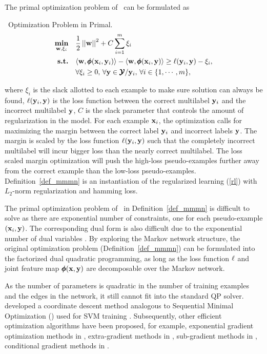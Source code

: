 {The primal optimization problem of \mmmn\ can be formulated as
\begin{definition}{\mmmn\ Optimization Problem in Primal.}\label{def_mmmn}
	\begin{align*}
		\underset{\mathbf {w},\mathbf{\xi}_i}{\textbf{min}} & \quad\frac{1}{2}\left|\left| \mathbf {w} \right|\right|^2 + C\sum_{i=1}^{m}\xi_i \\
		\textbf{s.t.} & \quad\langle \mathbf {w}, \pmb \phi(\mathbf {x}_i,\mathbf {y}_i) \rangle - \langle \mathbf {w}, \pmb \phi(\mathbf {x}_i,\mathbf {y}) \rangle \ge \mathbf {\ell}(\mathbf {y}_i,\mathbf {y})-\xi_i,\\
		& \quad \forall \xi_i\ge0,\, \forall \mathbf {y}\in\pmb {\mathcal{Y}}/\mathbf {y}_i,\, \forall i\in\{1,\cdots,m\},
	\end{align*}
\end{definition}
\noindent
where $\xi_i$ is the slack allotted to each example to make sure solution can always be found, $\mathbf {\ell}(\mathbf {y}_i,\mathbf {y})$ is the loss function between the correct multilabel $\mathbf {y}_i$ and the incorrect multilabel $\mathbf {y}$, $C$ is the slack parameter that controls the amount of regularization in the model.
For each example $\mathbf {x}_i$, the optimization calls for maximizing the margin between the correct label $\mathbf {y}_i$ and incorrect labels $\mathbf {y}$.
The margin is scaled by the loss function $\mathbf {\ell}(\mathbf {y}_i,{\mathbf {y}})$ such that the completely incorrect multilabel will incur bigger loss than the nearly correct multilabel.
The loss scaled margin optimization will push the high-loss pseudo-examples further away from the correct example than the low-loss pseudo-examples.
Definition~\ref{def_mmmn} is an instantiation of the regularized learning (\ref{rl}) with $L_2$-norm regularization and hamming loss.


The primal optimization problem of \mmmn\ in Definition~\ref{def_mmmn} is difficult to solve as there are exponential number of constraints, one for each pseudo-example $(\mathbf {x}_i,\mathbf {y})$.
The corresponding dual form is also difficult due to the exponential number of dual variables \citep{Taskar04max}.
By exploring the Markov network structure, the original optimization problem (Definition~\ref{def_mmmn}) can be formulated into the factorized dual quadratic programming, as long as the loss function $\mathbf {\ell}$ and joint feature map $\pmb \phi(\mathbf {x},\mathbf {y})$ are decomposable over the Markov network.

As the number of parameters is quadratic in the number of training examples and the edges in the network, it still cannot fit into the standard QP solver. 
\citet{Taskar04max} developed a coordinate descent method analogous to Sequential Minimal Optimization (\smo) used for SVM training \citep{Platt98sequential,Platt99fast}.
Subsequently, other efficient optimization algorithms have been proposed, for example, exponential gradient optimization methods in \citet{bartlett04}, extra-gradient methods in \citet{taskar06}, sub-gradient methods in \citet{Ratliff07}, conditional gradient methods in \citet{Rousu06, Rousu07}.

}
